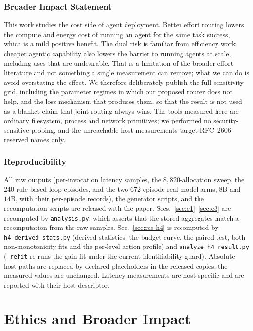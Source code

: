 \documentclass[10pt]{article} %
\begin{document}
\subsubsection*{Broader Impact Statement}
This work studies the cost side of agent deployment. Better effort routing lowers
the compute and energy cost of running an agent for the same task success, which
is a mild positive benefit. The dual risk is familiar from efficiency work:
cheaper agentic capability also lowers the barrier to running agents at scale,
including uses that are undesirable. That is a limitation of the broader effort
literature and not something a single measurement can remove; what we can do is
avoid overstating the effect. We therefore deliberately publish the full
sensitivity grid, including the parameter regimes in which our proposed router
does not help, and the loss mechanism that produces them, so that the result is
not used as a blanket claim that joint routing always wins. The tools measured
here are ordinary filesystem, process and network primitives; we performed no
security-sensitive probing, and the unreachable-host measurements target
RFC~2606 reserved names only.

\subsubsection*{Reproducibility}
All raw outputs (per-invocation latency samples, the $8{,}820$-allocation sweep,
the $240$ rule-based loop episodes, and the two $672$-episode real-model arms, $8$B and
$14$B, with their
per-episode records), the generator scripts, and the recomputation scripts are
released with the paper. Secs.~\ref{sec:e1}--\ref{sec:e3} are recomputed by
\texttt{analysis.py}, which asserts that the stored aggregates match a
recomputation from the raw samples. Sec.~\ref{sec:res-h4} is recomputed by
\texttt{h4\_derived\_stats.py} (derived statistics: the budget curve, the paired
test, both non-monotonicity fits and the per-level action profile) and
\texttt{analyze\_h4\_result.py} (\texttt{--refit} re-runs the gain fit under the
current identifiability guard). Absolute host paths are replaced by declared
placeholders in the released copies; the measured values are unchanged. Latency
measurements are host-specific and are reported with their host descriptor.

\section{Ethics and Broader Impact}
\end{document}
